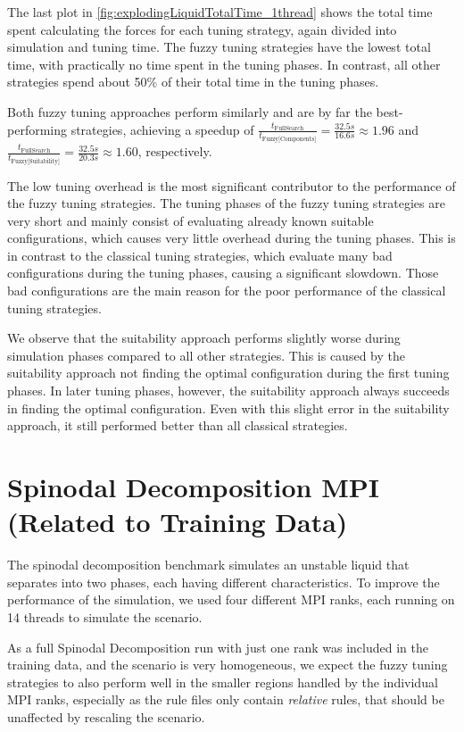 The last plot in \autoref{fig:explodingLiquidTotalTime_1thread} shows the total time spent calculating the forces for each tuning strategy, again divided into simulation and tuning time. The fuzzy tuning strategies have the lowest total time, with practically no time spent in the tuning phases. In contrast, all other strategies spend about 50\% of their total time in the tuning phases.

Both fuzzy tuning approaches perform similarly and are by far the best-performing strategies, achieving a speedup of $\frac{t_{\text{FullSearch}}}{t_{\text{Fuzzy[Components]}}} = \frac{32.5s}{16.6s} \approx 1.96$ and $\frac{t_{\text{FullSearch}}}{t_{\text{Fuzzy[Suitability]}}} = \frac{32.5s}{20.3s} \approx 1.60$, respectively.

The low tuning overhead is the most significant contributor to the performance of the fuzzy tuning strategies. The tuning phases of the fuzzy tuning strategies are very short and mainly consist of evaluating already known suitable configurations, which causes very little overhead during the tuning phases. This is in contrast to the classical tuning strategies, which evaluate many bad configurations during the tuning phases, causing a significant slowdown. Those bad configurations are the main reason for the poor performance of the classical tuning strategies.

We observe that the suitability approach performs slightly worse during simulation phases compared to all other strategies. This is caused by the suitability approach not finding the optimal configuration during the first tuning phases. In later tuning phases, however, the suitability approach always succeeds in finding the optimal configuration. Even with this slight error in the suitability approach, it still performed better than all classical strategies.


\section{Spinodal Decomposition MPI (Related to Training Data)}

The spinodal decomposition benchmark simulates an unstable liquid that separates into two phases, each having different characteristics. To improve the performance of the simulation, we used four different MPI ranks, each running on 14 threads to simulate the scenario.

As a full Spinodal Decomposition run with just one rank was included in the training data, and the scenario is very homogeneous, we expect the fuzzy tuning strategies to also perform well in the smaller regions handled by the individual MPI ranks, especially as the rule files only contain \emph{relative} rules, that should be unaffected by rescaling the scenario.

